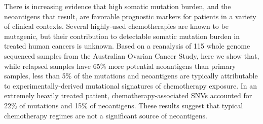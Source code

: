 There is increasing evidence that high somatic mutation burden, and the neoantigens that result, are favorable prognostic markers for patients in a variety of clinical contexts. Several highly-used chemotherapies are known to be mutagenic, but their contribution to detectable somatic mutation burden in treated human cancers is unknown. Based on a reanalysis of 115 whole genome sequenced samples from the Australian Ovarian Cancer Study, here we show that, while relapsed samples have 65\% more potential neoantigens than primary samples, less than 5\% of the mutations and neoantigens are typically attributable to experimentally-derived mutational signatures of chemotherapy exposure. In an extremely heavily treated patient, chemotherapy-associated SNVs accounted for 22\% of mutations and 15\% of neoantigens. These results suggest that typical chemotherapy regimes are not a significant source of neoantigens.


